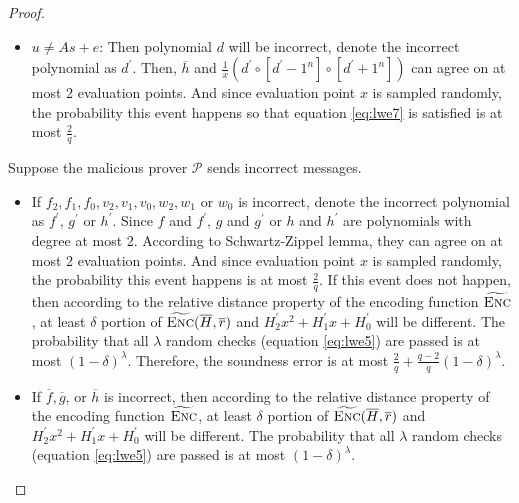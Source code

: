 \begin{proof}
\begin{itemize}
    \item $u \neq As + e$: Then polynomial $d$ will be incorrect, denote the incorrect polynomial as $d^\prime$. Then, $\overline{h}$ and $\frac{1}{x} (d^\prime \circ [d^\prime - 1^n] \circ [d^\prime + 1^n])$ can agree on at most 2 evaluation points. And since evaluation point $x$ is sampled randomly, the probability this event happens so that equation \ref{eq:lwe7} is satisfied is at most $\frac{2}{q}$. 
    
\end{itemize}

Suppose the malicious prover $\mathcal{P}$ sends incorrect messages. 
\begin{itemize}
    
    \item If $f_2, f_1, f_0, v_2, v_1, v_0, w_2, w_1$ or $w_0$ is incorrect, denote the incorrect polynomial as $f^\prime$, $g^\prime$ or $h^\prime$. Since $f$ and $f^\prime$, $g$ and $g^\prime$ or $h$ and $h^\prime$ are polynomials with degree at most 2. According to Schwartz-Zippel lemma, they can agree on at most 2 evaluation points. And since evaluation point $x$ is sampled randomly, the probability this event happens is at most $\frac{2}{q}$. If this event does not happen, then according to the relative distance property of the encoding function $\widetilde{\textsc{Enc}}$, at least $\delta$ portion of $\widetilde{\textsc{Enc}}(\overline{H}, \overline{r})$ and $H_2^\prime x^2 + H_1^\prime x + H_0^\prime$ will be different. The probability that all $\lambda$ random checks (equation \ref{eq:lwe5}) are passed is at most $(1 - \delta)^\lambda$. Therefore, the soundness error is at most $\frac{2}{q} + \frac{q-2}{q}(1 - \delta)^\lambda$.

    \item If $\overline{f}, \overline{g}$, or $\overline{h}$ is incorrect, then according to the relative distance property of the encoding function $\widetilde{\textsc{Enc}}$, at least $\delta$ portion of $\widetilde{\textsc{Enc}}(\overline{H}, \overline{r})$ and $H_2^\prime x^2 + H_1^\prime x + H_0^\prime$ will be different. The probability that all $\lambda$ random checks (equation \ref{eq:lwe5}) are passed is at most $(1 - \delta)^\lambda$.
    

\end{itemize}
\end{proof}

